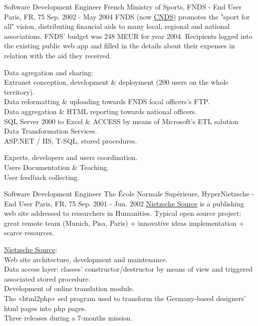 \begin{cventries}
  \cventry
    {Software Development Engineer} %
    {French Ministry of Sports, FNDS - End User} %
    {Paris, FR, 75} %
    {Sep. 2002 - May 2004} %
    {FNDS (now \href{http://www.cnds.sports.gouv.fr}{CNDS}) promotes the "sport for all" vision, distributing financial aids to many local, regional and national associations. FNDS' budget was 248 MEUR for year 2004. Recipients logged into the existing public web app and filled in the details about their expenses in relation with the aid they received.} %
{
      \begin{cvitems} %
        \item {Data agregation and sharing:\\Extranet conception, development \& deployment (200 users on the whole territory).\\Data reformatting \& uploading towards FNDS local officers's FTP.\\Data aggregation \& HTML reporting towards national officers.\\SQL Server 2000 to Excel \& ACCESS by means of Microsoft's ETL solution Data Transformation Services.\\ASP.NET / IIS, T-SQL, stored procedures.}
        \item {Experts, developers and users coordination.\\Users Documentation \& Teaching.\\User feedback collecting.}
      \end{cvitems}
} %

  \cventry
    {Software Development Engineer} %
    {The \'Ecole Normale Supérieure, HyperNietzsche - End User} %
    {Paris, FR, 75} %
    {Sep. 2001 - Jun. 2002} %
{
\href{http://www.nietzschesource.org}{Nietzsche Source} is a publishing web site addressed to researchers in Humanities.
Typical open source project: great remote team (Munich, Pisa, Paris) + innovative ideas implementation + scarce resources.
} %
{
      \begin{cvitems} %
        \item {\href{http://www.nietzschesource.org}{Nietzsche Source}:\\Web site architecture, development and maintenance.\\Data access layer: classes’ constructor/destructor by means of view and triggered associated stored procedure.\\Development of online translation module.\\The «html2php» sed program used to transform the Germany-based designers' html pages into php pages.\\Three releases during a 7-months mission.}
      \end{cvitems}
} %


\end{cventries}
